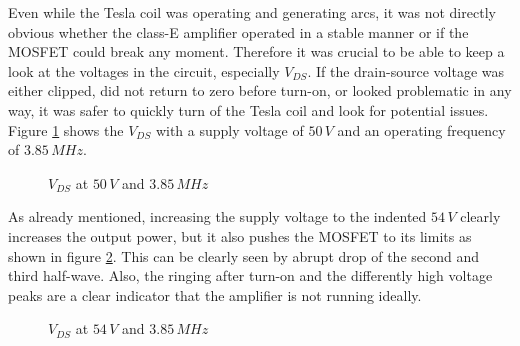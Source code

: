 Even while the Tesla coil was operating and generating arcs, it was not directly obvious whether the class-E amplifier operated in a stable manner or if the MOSFET could break any moment. Therefore it was crucial to be able to keep a look at the voltages in the circuit, especially \(V_{DS}\). If the drain-source voltage was either clipped, did not return to zero before turn-on, or looked problematic in any way, it was safer to quickly turn of the Tesla coil and look for potential issues. Figure \ref{fig:vds-50} shows the \(V_{DS}\) with a supply voltage of \(50\,V\) and an operating frequency of \(3.85\,MHz\).

\begin{figure}[h!]
    \centering
    \caption{\(V_{DS}\) at \(50\,V\) and \(3.85\,MHz\)}
    \label{fig:vds-50}
\end{figure}

As already mentioned, increasing the supply voltage to the indented \(54\,V\) clearly increases the output power, but it also pushes the MOSFET to its limits as shown in figure \ref{fig:vds-54}. This can be clearly seen by abrupt drop of the second and third half-wave. Also, the ringing after turn-on and the differently high voltage peaks are a clear indicator that the amplifier is not running ideally.

\begin{figure}[h!]
    \centering
    \caption{\(V_{DS}\) at \(54\,V\) and \(3.85\,MHz\)}
    \label{fig:vds-54}
\end{figure}

